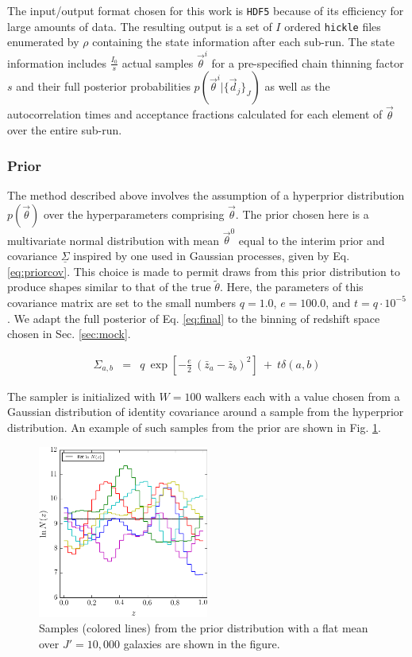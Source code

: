 \documentclass[preprint]{aastex}
\newcommand{\textul}{\underline}
\begin{document}
The input/output format chosen for this work is \texttt{HDF5} because of its 
efficiency for large amounts of data.  The resulting output is a set of $I$ 
ordered \texttt{hickle} files enumerated by $\rho$ containing the state 
information after each sub-run.  The state information includes 
$\frac{I_{0}}{s}$ actual samples $\vec{\theta}^{i}$ for a pre-specified chain 
thinning factor $s$ and their full posterior probabilities 
$p(\vec{\theta}^{i}|\{\vec{d}_{j}\}_{J})$ as well as the autocorrelation times 
and acceptance fractions calculated for each element of $\vec{\theta}$ over the 
entire sub-run.  

\clearpage
\subsubsection{Prior}
\label{sec:prior}

The method described above involves the assumption of a hyperprior distribution 
$p(\vec{\theta})$ over the hyperparameters comprising $\vec{\theta}$.  The 
prior chosen here is a multivariate normal distribution with mean 
$\vec{\theta}^{0}$ equal to the interim prior and covariance $\textul{\Sigma}$ 
inspired by one used in Gaussian processes, given by Eq. \ref{eq:priorcov}.  
This choice is made to permit draws from this prior distribution to produce 
shapes similar to that of the true $\tilde{\theta}$.  Here, the parameters of 
this covariance matrix are set to the small numbers $q=1.0$, $e=100.0$, and 
$t=q\cdot10^{-5}$.  We adapt the full posterior of Eq. \ref{eq:final} to the 
binning of redshift space chosen in Sec. \ref{sec:mock}.

\begin{eqnarray}
\label{eq:priorcov}
\Sigma_{a,b} &=& q\ \exp[-\frac{e}{2}\ (\bar{z}_{a}-\bar{z}_{b})^{2}]\ +\ 
t\delta(a,b)%
\end{eqnarray}

The sampler is initialized with $W=100$ walkers each with a value chosen from a 
Gaussian distribution of identity covariance around a sample from the 
hyperprior distribution.  An example of such samples from the prior are shown 
in Fig. \ref{fig:prior}.

\begin{figure}
\includegraphics[width=0.5\textwidth]{figs/null/priorsamps.png}
\caption{Samples (colored lines) from the prior distribution with a flat mean 
over $J'=10,000$ galaxies are shown in the figure.}
\label{fig:prior}
\end{figure}
\end{document}
